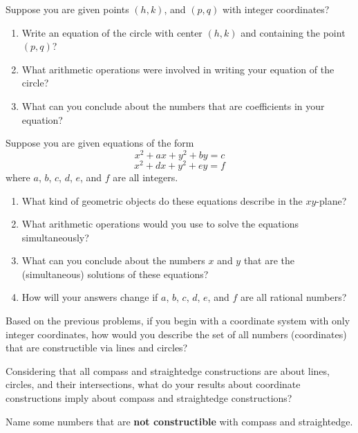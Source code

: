 \begin{prob}
Suppose you are given points $(h, k)$, and $(p, q)$ with integer coordinates?  
\begin{enumerate}
\item Write an equation of the circle with center $(h, k)$ and containing the point $(p, q)$?  
\item What arithmetic operations were involved in writing your equation of the circle?  
\item What can you conclude about the numbers that are coefficients in your equation?   
\end{enumerate}
\end{prob}

\begin{prob}
Suppose you are given equations of the form 
$$x^2 + ax +y^2+by = c$$
$$x^2 + dx +y^2+ey = f$$
where $a$, $b$, $c$, $d$, $e$, and $f$ are all integers.  
\begin{enumerate}
\item What kind of geometric objects do these equations describe in the $xy$-plane?  
\item What arithmetic operations would you use to solve the equations simultaneously? 
\item What can you conclude about the numbers $x$ and $y$ that are the (simultaneous) solutions of these equations?  
\item How will your answers change if $a$, $b$, $c$, $d$, $e$, and $f$  are all rational numbers?  
\end{enumerate}
\end{prob}

\begin{prob}
Based on the previous problems, if you begin with a coordinate system with only integer coordinates, how would you describe the set of all numbers (coordinates) that are constructible via lines and circles?  
\end{prob}

\begin{prob}
Considering that all compass and straightedge constructions are about lines, circles, and their intersections, what do your results about coordinate constructions imply about compass and straightedge constructions?  
\end{prob}

\begin{prob}
Name some numbers that are \textbf{not constructible} with compass and straightedge.  
\end{prob}

